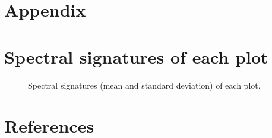 \documentclass[review]{elsarticle}
\begin{document}
\section{Appendix}

\appendix
\gdef\thesection{\Alph{section}} %
\makeatletter
\renewcommand\@seccntformat[1]{Appendix \csname the#1\endcsname.\hspace{0.5em}}
\makeatother

\section{Spectral signatures of each plot}

\begin{figure} [H]
	\begin{center}
		\caption{Spectral signatures (mean and standard deviation) of each plot.}
		\label{fig:spectral_signatures}
	\end{center}
\end{figure}

\pagebreak

\section*{References}


\end{document}
